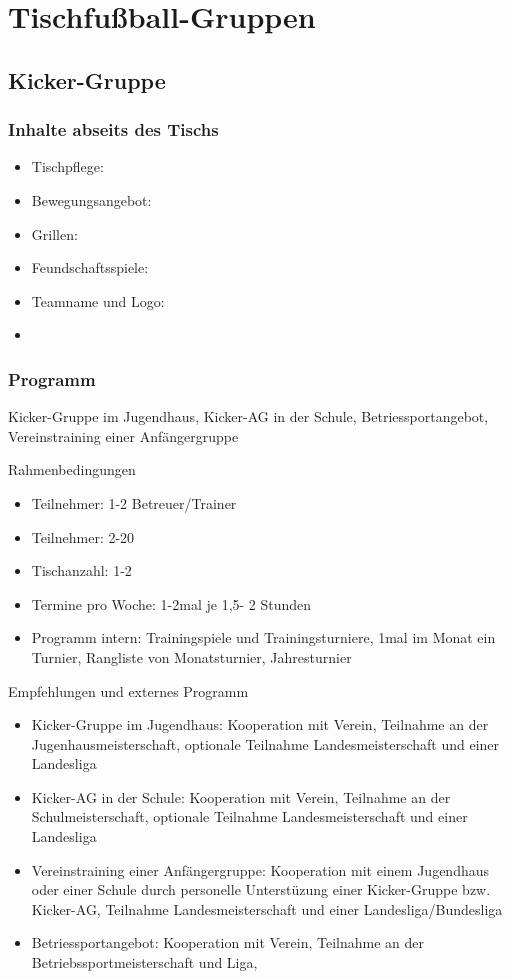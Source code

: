 \chapter{Tischfußball-Gruppen}

\section{Kicker-Gruppe}

\subsection{Inhalte abseits des Tischs}

\begin{itemize}
\item Tischpflege:  
\item Bewegungsangebot: 
\item Grillen:
\item Feundschaftsspiele:
\item Teamname und Logo:
\item 
\end{itemize} 


\subsection{Programm}

Kicker-Gruppe im Jugendhaus, Kicker-AG in der Schule, Betriessportangebot, Vereinstraining einer Anfängergruppe  

Rahmenbedingungen
\begin{itemize}
\item Teilnehmer: 1-2 Betreuer/Trainer  
\item Teilnehmer: 2-20
\item Tischanzahl: 1-2
\item Termine pro Woche: 1-2mal je 1,5- 2 Stunden
\item Programm intern: 
Trainingspiele und Trainingsturniere, 
1mal im Monat ein Turnier,
Rangliste von Monatsturnier,  
Jahresturnier
\end{itemize}

Empfehlungen und externes Programm
\begin{itemize}
\item Kicker-Gruppe im Jugendhaus: 
Kooperation mit Verein,
Teilnahme an der Jugenhausmeisterschaft,  
optionale Teilnahme Landesmeisterschaft und einer Landesliga
\item Kicker-AG in der Schule: 
Kooperation mit Verein, 
Teilnahme an der Schulmeisterschaft, 
optionale Teilnahme Landesmeisterschaft und einer Landesliga
\item Vereinstraining einer Anfängergruppe: 
Kooperation mit einem Jugendhaus oder einer Schule durch personelle Unterstüzung einer Kicker-Gruppe bzw. Kicker-AG, 
Teilnahme Landesmeisterschaft und einer Landesliga/Bundesliga
\item Betriessportangebot: 
Kooperation mit Verein, 
Teilnahme an der Betriebssportmeisterschaft und Liga,

\end{itemize}


